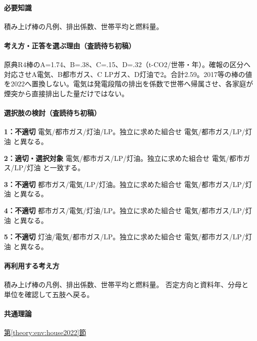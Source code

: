 \paragraph{必要知識} 積み上げ棒の凡例、排出係数、世帯平均と燃料量。

\paragraph{考え方・正答を選ぶ理由（査読待ち初稿）} 原典R4棒のA=\allowbreak{}1.74、B=.38、C=.15、D=.32（t-CO2/世帯・年）。確報の区分へ対応させA電気、B都市ガス、C LPガス、D灯油で2。合計2.59。2017等の棒の値を2022へ置換しない。電気は発電段階の排出を係数で世帯へ帰属させ、各家庭が煙突から直接排出した量だけではない。

\paragraph{選択肢の検討（査読待ち初稿）}\mbox{}\par

\noindent\textbf{1：不適切} 電気/都市ガス/灯油/LP。独立に求めた組合せ 電気/都市ガス/LP/灯油 と異なる。\par

\noindent\textbf{2：適切・選択対象} 電気/都市ガス/LP/灯油。独立に求めた組合せ 電気/都市ガス/LP/灯油 と一致する。\par

\noindent\textbf{3：不適切} 都市ガス/電気/LP/灯油。独立に求めた組合せ 電気/都市ガス/LP/灯油 と異なる。\par

\noindent\textbf{4：不適切} 都市ガス/電気/灯油/LP。独立に求めた組合せ 電気/都市ガス/LP/灯油 と異なる。\par

\noindent\textbf{5：不適切} 灯油/電気/都市ガス/LP。独立に求めた組合せ 電気/都市ガス/LP/灯油 と異なる。\par

\paragraph{再利用する考え方} 積み上げ棒の凡例、排出係数、世帯平均と燃料量。 否定方向と資料年、分母と単位を確認して五肢へ戻る。

\paragraph{共通理論} \hyperref[theory:env:house2022]{第\ref*{theory:env:house2022}節}

